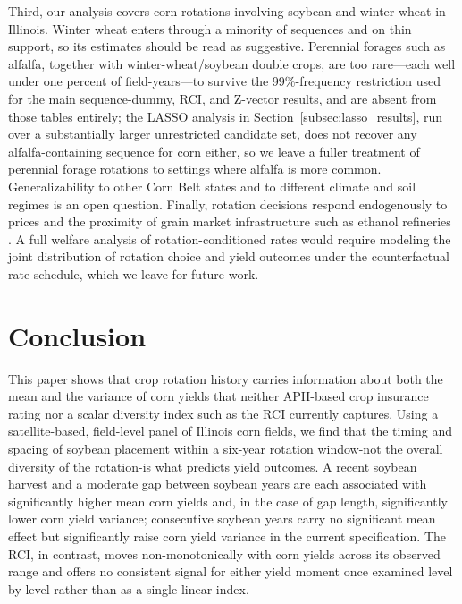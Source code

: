 \documentclass[12pt,letterpaper]{article}
\theoremstyle{remark}
\theoremstyle{remark}
\theoremstyle{plain}
\theoremstyle{definition}
\begin{document}
Third, our analysis covers corn rotations involving soybean and winter wheat in Illinois. Winter wheat enters through a minority of sequences and on thin support, so its estimates should be read as suggestive. Perennial forages such as alfalfa, together with winter-wheat/soybean double crops, are too rare---each well under one percent of field-years---to survive the 99\%-frequency restriction used for the main sequence-dummy, RCI, and Z-vector results, and are absent from those tables entirely; the LASSO analysis in Section~\ref{subsec:lasso_results}, run over a substantially larger unrestricted candidate set, does not recover any alfalfa-containing sequence for corn either, so we leave a fuller treatment of perennial forage rotations to settings where alfalfa is more common. Generalizability to other Corn Belt states and to different climate and soil regimes is an open question. Finally, rotation decisions respond endogenously to prices and the proximity of grain market infrastructure such as ethanol refineries \citep{Pates2025,cheu2025}. A full welfare analysis of rotation-conditioned rates would require modeling the joint distribution of rotation choice and yield outcomes under the counterfactual rate schedule, which we leave for future work.

\section{\label{sec:conclusion}Conclusion}
 
This paper shows that crop rotation history carries information about both the mean and the variance of corn yields that neither APH-based crop insurance rating nor a scalar diversity index such as the RCI currently captures. Using a satellite-based, field-level panel of Illinois corn fields, we find that the timing and spacing of soybean placement within a six-year rotation window-not the overall diversity of the rotation-is what predicts yield outcomes. A recent soybean harvest and a moderate gap between soybean years are each associated with significantly higher mean corn yields and, in the case of gap length, significantly lower corn yield variance; consecutive soybean years carry no significant mean effect but significantly raise corn yield variance in the current specification. The RCI, in contrast, moves non-monotonically with corn yields across its observed range and offers no consistent signal for either yield moment once examined level by level rather than as a single linear index.
\end{document}
